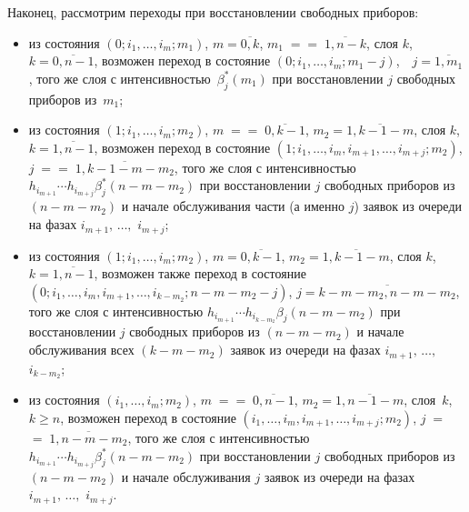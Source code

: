 \begin{multicols}{2}
Наконец, рассмотрим переходы при вос\-ста\-нов\-ле\-нии свободных приборов:
\begin{itemize}
\item из состояния $(0;i_1,\ldots,i_m;m_1)$, $m=\overline{0,k}$,
$m_1\;=$\linebreak $=\;\overline{1,n-k}$, слоя $k$, $k=\overline{0,n-1}$, возможен
переход в состояние $(0;i_1,\ldots,i_{m};m_1-j)$,\ \ $j=\overline{1,m_1}$,
того же слоя с интенсивностью~$\beta^*_j(m_1)$ при восстановлении
$j$ свободных приборов из~$m_1$;
\item
из состояния $(1;i_1,\ldots,i_m;m_2)$, $m\;=$\linebreak $=\;\overline{0,k-1}$,
$m_2=\overline{1,k-1-m}$, слоя $k$, $k=\overline{1,n-1}$,
возможен переход в состояние
$(1;i_1,\ldots,i_{m},i_{m+1},\ldots,i_{m+j};m_2)$,
$j\;=$\linebreak $=\;\overline{1,k-1-m-m_2}$, того же слоя с интенсивностью
$h_{i_{m+1}}\cdots h_{i_{m+j}}\beta^*_j(n-m-m_2)$ при вос\-ста\-нов\-ле\-нии
$j$ свободных приборов из $(n-m-m_2)$ и начале обслуживания части
(а именно $j$) заявок из очереди на фазах $i_{m+1},\,\ldots,$ $i_{m+j}$;
\item
из состояния $(1;i_1,\ldots,i_m;m_2)$, $m=\overline{0,k-1}$,
$m_2=\overline{1,k-1-m}$, слоя $k$, $k=\overline{1,n-1}$,
возможен также переход в состояние
$(0;i_1,\ldots,i_{m},i_{m+1},\ldots,i_{k-m_2};n-m-m_2-j)$,
$j=\overline{k-m-m_2,n-m-m_2}$, того же слоя с интенсивностью
$h_{i_{m+1}}\cdots h_{i_{k-m_2}}\beta_j(n-m-m_2)$
при восстановлении $j$ свободных приборов из $(n-m-m_2)$
и начале обслуживания всех $(k-m-m_2)$ заявок из очереди на фазах
$i_{m+1},\,\ldots,$ $i_{k-m_2}$;
\item
 из состояния $(i_1,\ldots,i_m;m_2)$, $m\;=$\linebreak $=\;\overline{0,n-1}$,
$m_2=\overline{1,n-1-m}$, слоя~$k$, $k\ge n$,
возможен переход в состояние
$(i_1,\ldots,i_{m},i_{m+1},\ldots,i_{m+j};m_2)$, $j\;=$\linebreak $=\;\overline{1,n-m-m_2}$,
того же слоя с ин\-тен\-сив\-ностью
$h_{i_{m+1}}\cdots h_{i_{m+j}}\beta^*_j(n-m-m_2)$
при восстановлении $j$ свободных приборов из $(n-m-m_2)$
и начале обслуживания $j$ заявок из очереди на фазах
$i_{m+1},\,\ldots,$ $i_{m+j}$.
\end{itemize}


\end{multicols}
